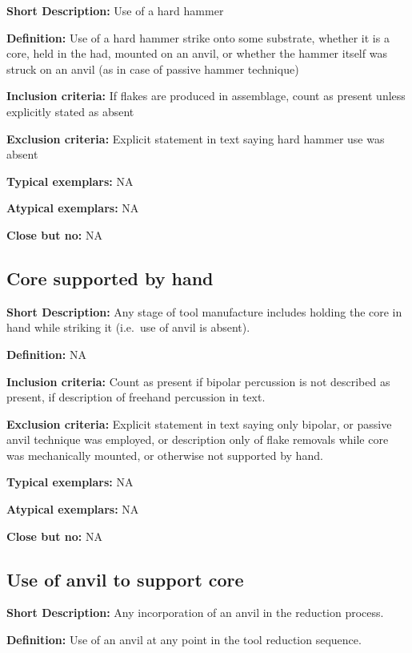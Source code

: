 \documentclass[
]{article}
\begin{document}
\textbf{Short Description:} Use of a hard hammer

\textbf{Definition:} Use of a hard hammer strike onto some substrate,
whether it is a core, held in the had, mounted on an anvil, or whether
the hammer itself was struck on an anvil (as in case of passive hammer
technique)

\textbf{Inclusion criteria:} If flakes are produced in assemblage, count
as present unless explicitly stated as absent

\textbf{Exclusion criteria:} Explicit statement in text saying hard
hammer use was absent

\textbf{Typical exemplars:} NA

\textbf{Atypical exemplars:} NA

\textbf{Close but no:} NA

\hypertarget{core-supported-by-hand}{%
\subsection{Core supported by hand}\label{core-supported-by-hand}}

\textbf{Short Description:} Any stage of tool manufacture includes
holding the core in hand while striking it (i.e.~use of anvil is
absent).

\textbf{Definition:} NA

\textbf{Inclusion criteria:} Count as present if bipolar percussion is
not described as present, if description of freehand percussion in text.

\textbf{Exclusion criteria:} Explicit statement in text saying only
bipolar, or passive anvil technique was employed, or description only of
flake removals while core was mechanically mounted, or otherwise not
supported by hand.

\textbf{Typical exemplars:} NA

\textbf{Atypical exemplars:} NA

\textbf{Close but no:} NA

\hypertarget{use-of-anvil-to-support-core}{%
\subsection{Use of anvil to support
core}\label{use-of-anvil-to-support-core}}

\textbf{Short Description:} Any incorporation of an anvil in the
reduction process.

\textbf{Definition:} Use of an anvil at any point in the tool reduction
sequence.
\end{document}
